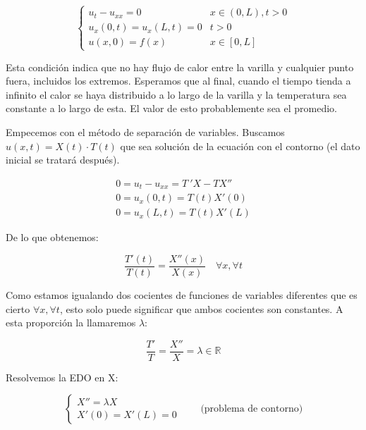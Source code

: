 	\begin{example} 

		\[
		\begin{cases}
		u_t - u_{xx} = 0 & x \in (0,L), t > 0 \\
		u_x(0,t) = u_x(L,t) = 0 & t > 0 \\
		u(x,0) = f(x) & x \in [0,L]
		\end{cases}
		\]

		Esta condición indica que no hay flujo de calor entre la varilla y cualquier punto fuera, incluidos los extremos. Esperamos que al final, cuando el tiempo tienda a infinito el calor se haya distribuido a lo largo de la varilla y la temperatura sea constante a lo largo de esta. El valor de esto probablemente sea el promedio.

		\begin{figure}[thbp]
		\centering
		\caption{}
		\label{fig:transmisionCalorNeumann}
		\end{figure}

		Empecemos con el método de separación de variables. Buscamos $u(x,t) = X(t) \cdot T(t)$ que sea solución de la ecuación con el contorno (el dato inicial se tratará después).


		\[
		\begin{array}{l}
			0 = u_t - u_{xx} = T\ ' X - T X'' \\
			0 = u_x (0,t) = T(t) X'(0) \\
			0 = u_x (L,t) = T(t) X'(L)
		\end{array}
		\]

		De lo que obtenemos:

		\[ \frac{T'(t)}{T(t)} = \frac{X''(x)}{X(x)} \quad \forall x, \forall t \]

		Como estamos igualando dos cocientes de funciones de variables diferentes que es cierto $\forall x, \forall t$, esto solo puede significar que ambos cocientes son constantes. A esta proporción la llamaremos $\lambda$:

		\[ \frac{T'}{T} = \frac{X''}{X} = \lambda \in \mathbb{R} \]

		Resolvemos la EDO en X:

		\[
		\left\{ \begin{array}{l}
		X'' = \lambda X \\
		X'(0) = X'(L) = 0
		\end{array} \right. \quad\quad \text{(problema de contorno)}
		\]


\end{example}
